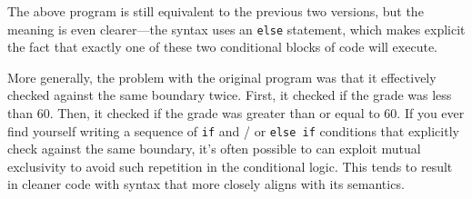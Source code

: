 \documentclass{article}
\begin{document}
The above program is still equivalent to the previous two versions, but the meaning is even clearer---the syntax uses an \texttt{else} statement, which makes explicit the fact that exactly one of these two conditional blocks of code will execute.

More generally, the problem with the original program was that it effectively checked against the same boundary twice. First, it checked if the grade was less than 60. Then, it checked if the grade was greater than or equal to 60. If you ever find yourself writing a sequence of \texttt{if} and / or \texttt{else if} conditions that explicitly check against the same boundary, it's often possible to can exploit mutual exclusivity to avoid such repetition in the conditional logic. This tends to result in cleaner code with syntax that more closely aligns with its semantics.


\end{document}

